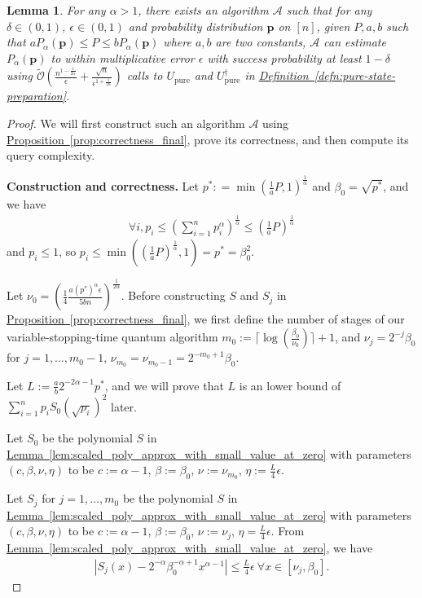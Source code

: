 \documentclass[journal]{IEEEtran}
\newtheorem{lemma}{Lemma}
\newcommand{\defn}[1]{\hyperref[defn:#1]{Definition~\ref*{defn:#1}}}
\newcommand{\lem}[1]{\hyperref[lem:#1]{Lemma~\ref*{lem:#1}}}
\newcommand{\prop}[1]{\hyperref[prop:#1]{Proposition~\ref*{prop:#1}}}
\begin{document}
\begin{lemma}
  \label{lem:large_alpha_given_P}
  For any $\alpha > 1$, there exists an algorithm $\mathcal{A}$ such that for any $\delta \in (0,1)$, $\epsilon\in(0,1)$ and probability distribution $\mathbf{p}$ on $[n]$, given $P,a,b$ such that $aP_{\alpha}(\mathbf{p}) \le P \le bP_{\alpha}(\mathbf{p})$ where $a,b$ are two constants, $\mathcal{A}$ can estimate $P_{\alpha}(\mathbf{p})$ to within multiplicative error $\epsilon$
  with success probability at least $1-\delta$ using $ \widetilde{\mathcal{O}}\left(\frac{n^{1-\frac{1}{2\alpha}}}{\epsilon} + \frac{\sqrt{n}}{\epsilon^{1+\frac{1}{2\alpha}}}\right)$ calls to $U_{\mathrm{pure}}$ and $U_{\mathrm{pure}}^{\dagger}$ in \defn{pure-state-preparation}.
\end{lemma}
\begin{proof}
We will first construct such an algorithm $\mathcal{A}$ using \prop{correctness_final}, prove its correctness, and then compute its query complexity.

\noindent
\textbf{Construction and correctness. }Let $p^*: = \min(\frac{1}{a}P,1)^{\frac{1}{\alpha}}$ and $\beta_0 = \sqrt{p^*}$, and we have
\begin{align}
  \forall i,p_i \le \left(\sum_{i = 1}^n p_i^{\alpha}\right)^{\frac{1}{\alpha}} \le \left(\frac{1}{a}P\right)^{\frac{1}{\alpha}}
\end{align}
and $p_i \le 1$, so $p_i\le \min((\frac{1}{a}P)^{\frac{1}{\alpha}},1) = p^* = \beta_0^2$.

    Let $\nu_0 = \left(\frac{1}{4}\frac{a(p^*)^{\alpha}\epsilon}{5bn}\right)^{\frac{1}{2\alpha}}$. Before constructing $S$ and $S_j$ in \prop{correctness_final}, we first define the number of stages of our variable-stopping-time quantum algorithm $m_0:=\lceil \log(\frac{\beta_0}{\nu_0})\rceil+1$, and $\nu_j = 2^{-j} \beta_0$ for $j = 1,\ldots, m_0-1$, $\nu_{m_0} = \nu_{m_0-1} = 2^{-m_0+1}\beta_0$.

    Let $L := \frac{a}{b}2^{-2\alpha-1}p^*$, and we will prove that $L$ is an lower bound of $\sum_{i=1}^n p_i S_0(\sqrt{p_i})^2$ later.
    
    Let $S_0$ be the polynomial $S$ in \lem{scaled_poly_approx_with_small_value_at_zero} with parameters $(c,\beta,\nu,\eta)$ to be $c := \alpha-1$, $\beta:= \beta_0$, $\nu:= \nu_{m_0}$, $\eta := \frac{L}{4}\epsilon$.
    
    Let $S_j$ for $j=1,\ldots, m_0$ be the polynomial $S$ in \lem{scaled_poly_approx_with_small_value_at_zero} with parameters $(c,\beta,\nu,\eta)$ to be $c := \alpha-1$, $\beta:= \beta_0$, $\nu:= \nu_j$, $\eta = \frac{L}{4}\epsilon$. From \lem{scaled_poly_approx_with_small_value_at_zero}, we have
    \begin{align}
    \label{eq:equation_S_j}
        |S_j(x)-2^{-\alpha}\beta_0^{-\alpha+1}x^{\alpha-1}| \le \frac{L}{4}\epsilon \ \forall x\in [\nu_j,\beta_0].
    \end{align}


\end{proof}
\end{document}
